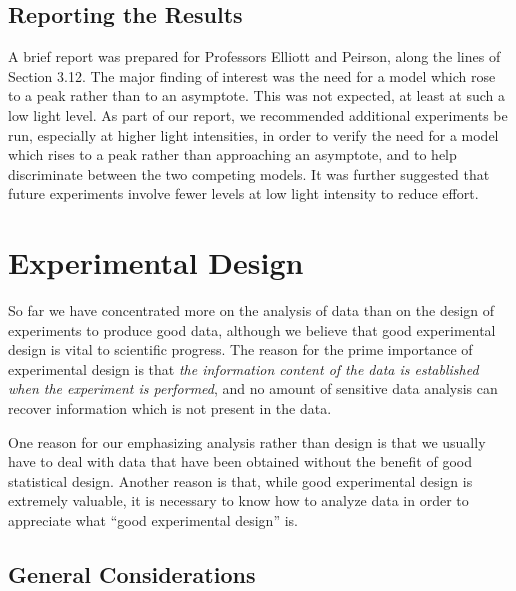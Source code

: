 \subsection{Reporting the Results}

A brief report was prepared for Professors Elliott and
Peirson, along the lines of Section 3.12.
The major finding of interest was the need for a model which rose
to a peak rather than to an asymptote.
This was not expected, at least at such a low light level.
As part of our report, we recommended additional experiments be
run, especially at higher light intensities, in order to verify
the need for a model which rises to a peak rather than approaching an
asymptote, and to help discriminate between the two competing models.
It was further suggested that future experiments involve fewer
levels at low light intensity to reduce effort.

\section{Experimental Design}

So far we have concentrated more on the analysis of data
than on the design of experiments to produce good data, although
we believe that good experimental design is vital to
scientific progress.
The reason for the prime importance of experimental design is
that {\em the information content of the data is established
when the experiment is performed}, and no amount of sensitive data
analysis can recover information which is not present in the
data.

One reason for our emphasizing analysis rather than design is
that we usually have to deal with data that have been
obtained without the benefit of good statistical design.
Another reason is that, while good experimental design is
extremely valuable, it is necessary to know how to analyze data
in order to appreciate what ``good experimental design'' is.

\subsection{General Considerations}

